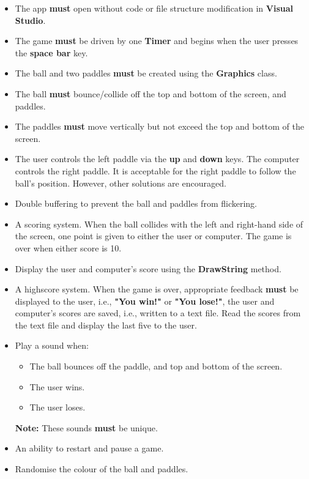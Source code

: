 \documentclass{article}
\begin{document}
\begin{itemize}
    \item The app \textbf{must} open without code or file structure modification in \textbf{Visual Studio}.
    \item The game \textbf{must} be driven by one \textbf{Timer} and begins when the user presses the \textbf{space bar} key.
    \item The ball and two paddles \textbf{must} be created using the \textbf{Graphics} class. 
    \item The ball \textbf{must} bounce/collide off the top and bottom of the screen, and paddles.
    \item The paddles \textbf{must} move vertically but not exceed the top and bottom of the screen.
    \item The user controls the left paddle via the \textbf{up} and \textbf{down} keys. The computer controls the right paddle. It is acceptable for the right paddle to follow the ball's position. However, other solutions are encouraged.
    \item Double buffering to prevent the ball and paddles from flickering.
    \item A scoring system. When the ball collides with the left and right-hand side of the screen, one point is given to either the user or computer. The game is over when either score is 10. 
    \item Display the user and computer's score using the \textbf{DrawString} method.
    \item A highscore system. When the game is over, appropriate feedback \textbf{must} be displayed to the user, i.e., \textbf{"You win!"} or \textbf{"You lose!"}, the user and computer's scores are saved, i.e., written to a text file. Read the scores from the text file and display the last five to the user.
    \item Play a sound when:
    \begin{itemize}
        \item The ball bounces off the paddle, and top and bottom of the screen.
        \item The user wins.
        \item The user loses.
    \end{itemize}
    \textbf{Note:} These sounds \textbf{must} be unique.
    \item An ability to restart and pause a game.
    \item Randomise the colour of the ball and paddles.
\end{itemize}
\end{document}
